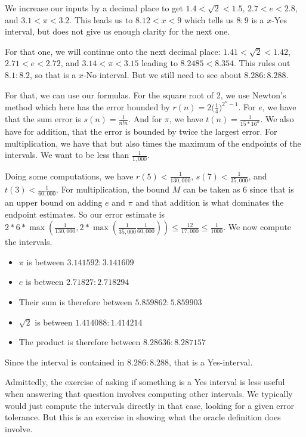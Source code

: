 \documentclass[12pt]{article}
\theoremstyle{remark}
\begin{document}
We increase our inputs by a decimal place to get $1.4 < \sqrt{2} < 1.5$, $2.7<e<2.8$, and $3.1 < \pi<3.2$. This leads us to $8.12 < x < 9$ which tells us $8:9$ is a $x$-Yes interval, but does not give us enough clarity for the next one. 

For that one, we will continue onto the next decimal place: $1.41 < \sqrt{2} < 1.42$, $2.71<e<2.72$, and $3.14 < \pi<3.15$ leading to $8.2485 < 8.354$. This rules out $8.1:8.2$, so that is a $x$-No interval. But we still need to see about $8.286:8.288$.

For that, we can use our formulas. For the square root of 2, we use Newton's method which here has the error bounded by $r(n) = 2\big(\frac{1}{4}\big)^{2^n-1}$. For $e$, we have that the sum error is $s(n) = \frac{1}{n!n}$. And for $\pi$, we have $t(n) = \frac{1}{15 * 16^n}$. We also have for addition, that the error is bounded by twice the largest error. For multiplication, we have that but also times the maximum of the endpoints of the intervals. We want to be less than $\frac{1}{1,000}$. 

Doing some computations, we have $r(5) < \frac{1}{130,000}$, $s(7) < \frac{1}{35,000}$, and $t(3) < \frac{1}{60,000}$. For multiplication, the bound $M$ can be taken as 6 since that is an upper bound on adding $e$ and $\pi$ and that addition is what dominates the endpoint estimates. So our error estimate is $2*6*\max(\frac{1}{130,000}, 2*\max(\frac{1}{35,000}\frac{1}{60,000})) \leq \frac{12}{17,000} \leq \frac{1}{1000}$. We now compute the intervals.  

\begin{itemize}
    \item $\pi$ is between $3.141592:3.141609$
    \item $e$ is between $2.71827:2.718294$
    \item Their sum is therefore between $5.859862:5.859903$
    \item $\sqrt{2}$ is between $1.414088:1.414214$
    \item The product is therefore between $8.28636:8.287157$
\end{itemize}

Since the interval is contained in $8.286:8.288$, that is a Yes-interval. 

Admittedly, the exercise of asking if something is a Yes interval is less useful when answering that question involves computing other intervals. We typically would just compute the intervals directly in that case, looking for a given error tolerance. But this is an exercise in showing what the oracle definition does involve.
\end{document}
